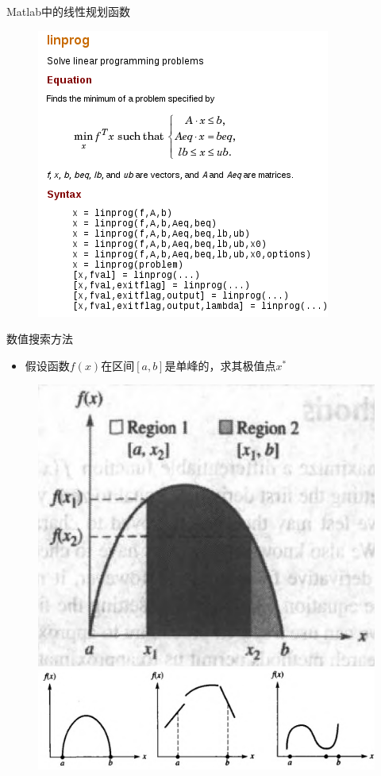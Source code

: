 \documentclass[mathserif, table]{beamer}
\begin{document}
\begin{frame}{Matlab中的线性规划函数}
  \begin{figure}
    \includegraphics[height=\textheight{}]{linprog.png}
  \end{figure}  

\end{frame}

\begin{frame}{数值搜索方法}
  \begin{itemize}
  \item 假设函数$f(x)$在区间$[a,b]$是单峰的，求其极值点$x^*$
  \end{itemize}

  \begin{figure}
    \includegraphics[width=.4\textwidth{}]{part.png}

    \includegraphics[width=.8\textwidth{}]{unimodal.png}
  \end{figure}  
  
\end{frame}
\end{document}
